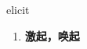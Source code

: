 
\begin{frame}
{\huge elicit}
\begin{center}
\begin{enumerate}\Large
  \item \textbf{激起，唤起}
\end{enumerate}
\end{center}
\end{frame}
